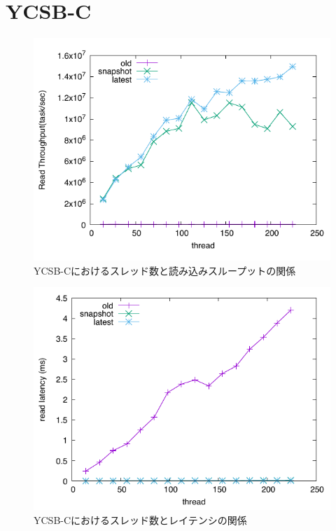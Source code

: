 \documentclass[a4paper]{jreport}	%
\begin{document}


\section{YCSB-C}

\begin{figure}[h] 
\centering
\includegraphics[width=15cm]{ycsb-c/opposite-read-throughput}
\caption{YCSB-Cにおけるスレッド数と読み込みスループットの関係}
\label{fig:throughput-c}
\end{figure}

\begin{figure}[h] 
\centering
\includegraphics[width=15cm]{ycsb-c/opposite-read-latency}
\caption{YCSB-Cにおけるスレッド数とレイテンシの関係}
\label{fig:latency-c}
\end{figure}
\end{document}
